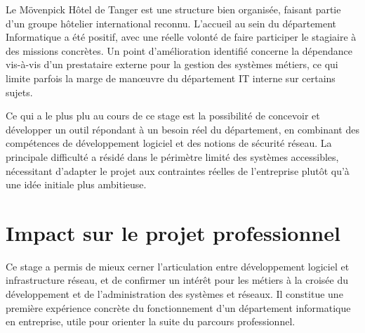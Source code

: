 Le Mövenpick Hôtel de Tanger est une structure bien organisée, faisant partie d'un
groupe hôtelier international reconnu. L'accueil au sein du département Informatique a
été positif, avec une réelle volonté de faire participer le stagiaire à des missions
concrètes. Un point d'amélioration identifié concerne la dépendance vis-à-vis d'un
prestataire externe pour la gestion des systèmes métiers, ce qui limite parfois la marge
de man\oe{}uvre du département IT interne sur certains sujets.

Ce qui a le plus plu au cours de ce stage est la possibilité de concevoir et développer
un outil répondant à un besoin réel du département, en combinant des compétences de
développement logiciel et des notions de sécurité réseau. La principale difficulté a
résidé dans le périmètre limité des systèmes accessibles, nécessitant d'adapter le
projet aux contraintes réelles de l'entreprise plutôt qu'à une idée initiale plus
ambitieuse.

\section*{Impact sur le projet professionnel}

Ce stage a permis de mieux cerner l'articulation entre développement logiciel et
infrastructure réseau, et de confirmer un intérêt pour les métiers à la croisée du
développement et de l'administration des systèmes et réseaux. Il constitue une première
expérience concrète du fonctionnement d'un département informatique en entreprise,
utile pour orienter la suite du parcours professionnel.
